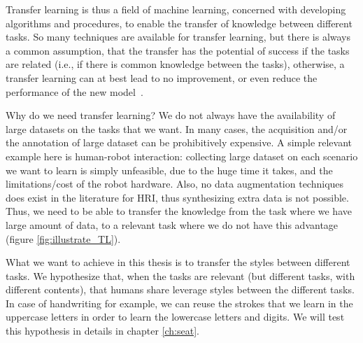 \par Transfer learning is thus a field of machine learning, concerned with developing algorithms and procedures, to enable the transfer of knowledge between different tasks. So many techniques are available for transfer learning, but there is always a common assumption, that the transfer has the potential of success if the tasks are related (i.e., if there is common knowledge between the tasks), otherwise, a transfer learning can at best lead to no improvement, or even reduce the performance of the new model~\citep{weiss2016survey}.

\par Why do we need transfer learning? We do not always have the availability of large datasets on the tasks that we want. In many cases, the acquisition and/or the annotation of large dataset can be prohibitively expensive. A simple relevant example here is human-robot interaction: collecting large dataset on each scenario we want to learn is simply unfeasible, due to the huge time it takes, and the limitations/cost of the robot hardware. Also, no data augmentation techniques does exist in the literature for HRI, thus synthesizing extra data is not possible. Thus, we need to be able to transfer the knowledge from the task where we have large amount of data, to a relevant task where we do not have this advantage (figure \ref{fig:illustrate_TL}).

\par What we want to achieve in this thesis is to transfer the styles between different tasks. We hypothesize that, when the tasks are relevant (but different tasks, with different contents), that humans share leverage styles between the different tasks. In case of handwriting for example, we can reuse the strokes that we learn in the uppercase letters in order to learn the lowercase letters and digits. We will test this hypothesis in details in chapter \ref{ch:seat}.

